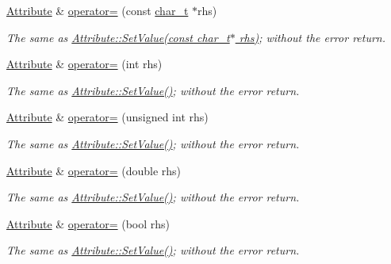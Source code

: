 \begin{DoxyCompactItemize}
\hyperlink{classphys_1_1xml_1_1Attribute}{Attribute} \& \hyperlink{classphys_1_1xml_1_1Attribute_a78d7a0436d386040e2d1f8954304b25b}{operator=} (const \hyperlink{namespacephys_1_1xml_afc87705cd1c2917d87b879715a2d8f6e}{char\_\-t} $\ast$rhs)
\begin{DoxyCompactList}\small\item\em The same as \hyperlink{classphys_1_1xml_1_1Attribute_a470512fcd8b4f7609319bf85df100aaa}{Attribute::SetValue(const char\_\-t$\ast$ rhs)}; without the error return. \item\end{DoxyCompactList}\item 
\hyperlink{classphys_1_1xml_1_1Attribute}{Attribute} \& \hyperlink{classphys_1_1xml_1_1Attribute_ac9a18c2b6c4bfc0cdfe4eede938a91fe}{operator=} (int rhs)
\begin{DoxyCompactList}\small\item\em The same as \hyperlink{classphys_1_1xml_1_1Attribute_a470512fcd8b4f7609319bf85df100aaa}{Attribute::SetValue()}; without the error return. \item\end{DoxyCompactList}\item 
\hyperlink{classphys_1_1xml_1_1Attribute}{Attribute} \& \hyperlink{classphys_1_1xml_1_1Attribute_af6b6e5202b23be948b986cb0bcdf5da8}{operator=} (unsigned int rhs)
\begin{DoxyCompactList}\small\item\em The same as \hyperlink{classphys_1_1xml_1_1Attribute_a470512fcd8b4f7609319bf85df100aaa}{Attribute::SetValue()}; without the error return. \item\end{DoxyCompactList}\item 
\hyperlink{classphys_1_1xml_1_1Attribute}{Attribute} \& \hyperlink{classphys_1_1xml_1_1Attribute_ac92a92492d624984a52b64bc4fabf355}{operator=} (double rhs)
\begin{DoxyCompactList}\small\item\em The same as \hyperlink{classphys_1_1xml_1_1Attribute_a470512fcd8b4f7609319bf85df100aaa}{Attribute::SetValue()}; without the error return. \item\end{DoxyCompactList}\item 
\hyperlink{classphys_1_1xml_1_1Attribute}{Attribute} \& \hyperlink{classphys_1_1xml_1_1Attribute_a008397ad3c9c63bf27a4dca4b68e5efd}{operator=} (bool rhs)
\begin{DoxyCompactList}\small\item\em The same as \hyperlink{classphys_1_1xml_1_1Attribute_a470512fcd8b4f7609319bf85df100aaa}{Attribute::SetValue()}; without the error return. \item\end{DoxyCompactList}\item 

\end{DoxyCompactItemize}
